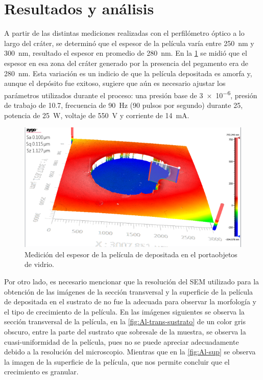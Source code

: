 \documentclass[12pt]{IEEEtran}
\begin{document}
\section{Resultados y análisis}

A partir de las distintas mediciones realizadas con el perfilómetro óptico a lo largo del cráter, se determinó que el espesor de la película varía entre \qty{250}{\nm} y \qty{300}{\nm}, resultado el espesor en promedio de \qty{280}{\nm}. En la \cref{fig:OP-grosor} se midió que el espesor en esa zona del cráter generado por la presencia del pegamento era de \qty{280}{\nm}. Esta variación es un indicio de que la película depositada es amorfa y, aunque el depósito fue exitoso, sugiere que aún es necesario ajustar los parámetros utilizados durante el proceso: una presión base de \qty{3e-6}{\Torr}, presión de trabajo de \qty{10.7}{\mTorr}, frecuencia de \qty{90}{\Hz} (90 pulsos por segundo) durante \qty{25}{\min}, potencia de \qty{25}{\W}, voltaje de \qty{550}{\V} y corriente de \qty{14}{\mA}.

\begin{figure}[htp]
	\centering
	\includegraphics[width=0.8\linewidth]{OP-grosor}
	\caption{Medición del espesor de la película de  depositada en el portaobjetos de vidrio.}
	\label{fig:OP-grosor}
\end{figure}

Por otro lado, es necesario mencionar que la resolución del SEM utilizado para la obtención de las imágenes de la sección transversal y la superficie de la película de  depositada en el sustrato de  no fue la adecuada para observar la morfología y el tipo de crecimiento de la película. En las imágenes siguientes se observa la sección transversal de la película, en la \cref{fig:Al-trans-sustrato} de un color gris obscuro, entre la parte del sustrato que sobresale de la muestra, se observa la cuasi-uniformidad de la película, pues no se puede apreciar adecuadamente debido a la resolución del microscopio. Mientras que en la \cref{fig:Al-sup} se observa la imagen de la superficie de la película, que nos permite concluir que el crecimiento es granular.
\end{document}
